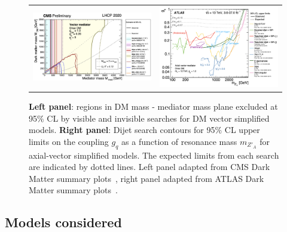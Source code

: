 \documentclass[11pt]{article}
\begin{document}
\begin{figure}[ht]
\begin{tabular}{ll}
\includegraphics[scale=0.17]{DMsummaryplots_med_dm.png}
&
\includegraphics[scale=0.185]{DMsummaryplots_med_gq.png}
\end{tabular}
\caption{{\bf Left panel}: regions in DM mass - mediator mass plane excluded at 95$\%$ CL by visible and invisible searches for DM vector simplified models. {\bf Right panel}: Dijet search contours for 95$\%$ CL upper limits on the coupling $g_{q}$ as a function of resonance mass $m_{Z'_{A}}$ for axial-vector simplified models. The expected limits from each search are indicated by dotted lines. Left panel adapted from CMS Dark Matter summary plots~\cite{CMSSummary}, right panel adapted from ATLAS Dark Matter summary plots~\cite{ATL-PHYS-DMSUM-JHEP-2019}.
}
\label{Fig:Fig1}
\end{figure}

\subsection{Models considered}
\end{document}
